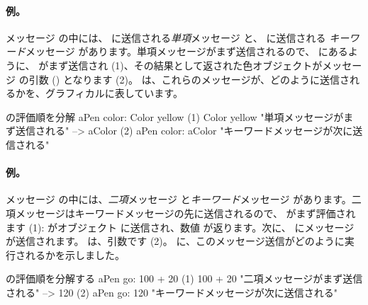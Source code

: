 \documentclass[a4paper,10pt,twoside]{book}
\begin{document}


\paragraph{例。}
メッセージ  の中には、 に送信される\emph{単項}メッセージ と、 に送信される \emph{キーワード}メッセージ  があります。単項メッセージがまず送信されるので、 にあるように、 がまず送信され (1)、その結果として返された色オブジェクトがメッセージ  の引数 () となります (2)。
 は、これらのメッセージが、どのように送信されるかを、グラフィカルに表しています。

\begin{example}[decColor]{の評価順を分解}{}
        aPen color: Color yellow
(1)                       Color yellow        "単項メッセージがまず送信される"
                        --> aColor
(2)   aPen color: aColor                 "キーワードメッセージが次に送信される"
\end{example}

\paragraph{例。} メッセージ  の中には、\emph{二項}メッセージ  と\emph{キーワード}メッセージ  があります。二項メッセージはキーワードメッセージの先に送信されるので、 がまず評価されます (1):  がオブジェクト  に送信され、数値  が返ります。次に、 にメッセージ  が送信されます。 は、引数です (2)。
に、このメッセージ送信がどのように実行されるかを示しました。

\begin{example}[decGo]{の評価順を分解する}{}
      aPen go: 100 + 20   
(1)                 100 + 20           "二項メッセージがまず送信される"
                   -->   120
(2)  aPen go: 120                   "キーワードメッセージが次に送信される"
\end{example}
\end{document}
